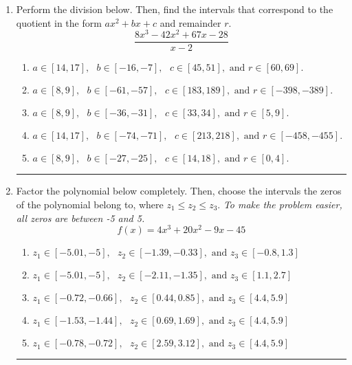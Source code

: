 \documentclass[14pt]{extbook}
\newcommand{\litem}[1]{\item#1\hspace*{-1cm}\rule{\textwidth}{0.4pt}}
\begin{document}
\begin{enumerate}
\litem{
Perform the division below. Then, find the intervals that correspond to the quotient in the form $ax^2+bx+c$ and remainder $r$.\[ \frac{8x^{3} -42 x^{2} +67 x -28}{x -2} \]\begin{enumerate}[label=\Alph*.]
\item \( a \in [14, 17], \text{   } b \in [-16, -7], \text{   } c \in [45, 51], \text{   and   } r \in [60, 69]. \)
\item \( a \in [8, 9], \text{   } b \in [-61, -57], \text{   } c \in [183, 189], \text{   and   } r \in [-398, -389]. \)
\item \( a \in [8, 9], \text{   } b \in [-36, -31], \text{   } c \in [33, 34], \text{   and   } r \in [5, 9]. \)
\item \( a \in [14, 17], \text{   } b \in [-74, -71], \text{   } c \in [213, 218], \text{   and   } r \in [-458, -455]. \)
\item \( a \in [8, 9], \text{   } b \in [-27, -25], \text{   } c \in [14, 18], \text{   and   } r \in [0, 4]. \)

\end{enumerate} }
\litem{
Factor the polynomial below completely. Then, choose the intervals the zeros of the polynomial belong to, where $z_1 \leq z_2 \leq z_3$. \textit{To make the problem easier, all zeros are between -5 and 5.}\[ f(x) = 4x^{3} +20 x^{2} -9 x -45 \]\begin{enumerate}[label=\Alph*.]
\item \( z_1 \in [-5.01, -5], \text{   }  z_2 \in [-1.39, -0.33], \text{   and   } z_3 \in [-0.8, 1.3] \)
\item \( z_1 \in [-5.01, -5], \text{   }  z_2 \in [-2.11, -1.35], \text{   and   } z_3 \in [1.1, 2.7] \)
\item \( z_1 \in [-0.72, -0.66], \text{   }  z_2 \in [0.44, 0.85], \text{   and   } z_3 \in [4.4, 5.9] \)
\item \( z_1 \in [-1.53, -1.44], \text{   }  z_2 \in [0.69, 1.69], \text{   and   } z_3 \in [4.4, 5.9] \)
\item \( z_1 \in [-0.78, -0.72], \text{   }  z_2 \in [2.59, 3.12], \text{   and   } z_3 \in [4.4, 5.9] \)


\end{enumerate}}
\end{enumerate}
\end{document}
